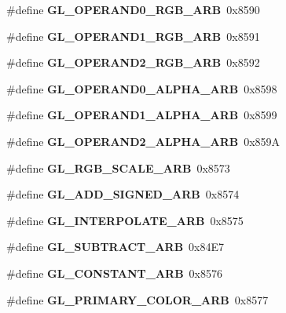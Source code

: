 \begin{DoxyCompactItemize}
\item 
\#define {\bfseries G\+L\+\_\+\+O\+P\+E\+R\+A\+N\+D0\+\_\+\+R\+G\+B\+\_\+\+A\+R\+B}~0x8590\label{_s_d_l__opengl_8h_a0c6bc7f44854de31ee249e45cc6bb487}

\item 
\#define {\bfseries G\+L\+\_\+\+O\+P\+E\+R\+A\+N\+D1\+\_\+\+R\+G\+B\+\_\+\+A\+R\+B}~0x8591\label{_s_d_l__opengl_8h_a365fa5dfad8bc9050186bad0fbccd3da}

\item 
\#define {\bfseries G\+L\+\_\+\+O\+P\+E\+R\+A\+N\+D2\+\_\+\+R\+G\+B\+\_\+\+A\+R\+B}~0x8592\label{_s_d_l__opengl_8h_adedfa8f970adcbd17a1bf9b317ba247a}

\item 
\#define {\bfseries G\+L\+\_\+\+O\+P\+E\+R\+A\+N\+D0\+\_\+\+A\+L\+P\+H\+A\+\_\+\+A\+R\+B}~0x8598\label{_s_d_l__opengl_8h_a8fe6481c363e98c6187fc5c46c42f8be}

\item 
\#define {\bfseries G\+L\+\_\+\+O\+P\+E\+R\+A\+N\+D1\+\_\+\+A\+L\+P\+H\+A\+\_\+\+A\+R\+B}~0x8599\label{_s_d_l__opengl_8h_af7c8b6f1a758bad73c2d66d211b3facf}

\item 
\#define {\bfseries G\+L\+\_\+\+O\+P\+E\+R\+A\+N\+D2\+\_\+\+A\+L\+P\+H\+A\+\_\+\+A\+R\+B}~0x859\+A\label{_s_d_l__opengl_8h_ab2370c3879e2e722fb97f5d8d4917ad3}

\item 
\#define {\bfseries G\+L\+\_\+\+R\+G\+B\+\_\+\+S\+C\+A\+L\+E\+\_\+\+A\+R\+B}~0x8573\label{_s_d_l__opengl_8h_a8790c9d55cf268a27d1c8ceffcee2f96}

\item 
\#define {\bfseries G\+L\+\_\+\+A\+D\+D\+\_\+\+S\+I\+G\+N\+E\+D\+\_\+\+A\+R\+B}~0x8574\label{_s_d_l__opengl_8h_a2beaca3371ab12a8a2870eb9f3dbc10f}

\item 
\#define {\bfseries G\+L\+\_\+\+I\+N\+T\+E\+R\+P\+O\+L\+A\+T\+E\+\_\+\+A\+R\+B}~0x8575\label{_s_d_l__opengl_8h_ac825a742197eb5727fbab86125fabd0e}

\item 
\#define {\bfseries G\+L\+\_\+\+S\+U\+B\+T\+R\+A\+C\+T\+\_\+\+A\+R\+B}~0x84\+E7\label{_s_d_l__opengl_8h_a07084a221a5e2f372d7d3e38df084aea}

\item 
\#define {\bfseries G\+L\+\_\+\+C\+O\+N\+S\+T\+A\+N\+T\+\_\+\+A\+R\+B}~0x8576\label{_s_d_l__opengl_8h_aeafd5182e917fd57c02593acfaf4cc37}

\item 
\#define {\bfseries G\+L\+\_\+\+P\+R\+I\+M\+A\+R\+Y\+\_\+\+C\+O\+L\+O\+R\+\_\+\+A\+R\+B}~0x8577\label{_s_d_l__opengl_8h_ae92ed5bf4c9ea82af212731519e4f954}


\end{DoxyCompactItemize}
